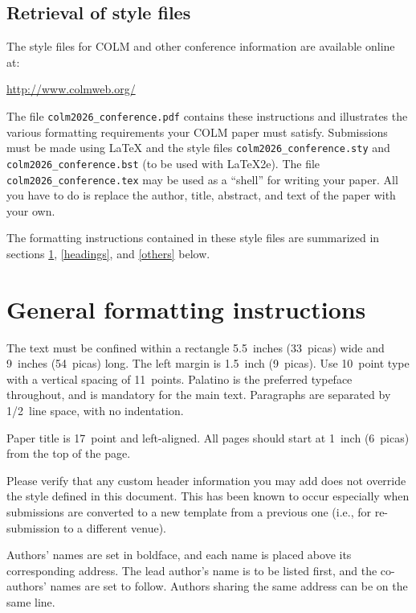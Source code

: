 \documentclass{article} %
\begin{document}
  

\subsection{Retrieval of style files}

The style files for COLM and other conference information are available online at:
\begin{center}
   \url{http://www.colmweb.org/}
\end{center}
The file \verb+colm2026_conference.pdf+ contains these
instructions and illustrates the
various formatting requirements your COLM paper must satisfy.
Submissions must be made using \LaTeX{} and the style files
\verb+colm2026_conference.sty+ and \verb+colm2026_conference.bst+ (to be used with \LaTeX{}2e). The file
\verb+colm2026_conference.tex+ may be used as a ``shell'' for writing your paper. All you
have to do is replace the author, title, abstract, and text of the paper with
your own.

The formatting instructions contained in these style files are summarized in
sections \ref{gen_inst}, \ref{headings}, and \ref{others} below.

\section{General formatting instructions}
\label{gen_inst}

The text must be confined within a rectangle 5.5~inches (33~picas) wide and
9~inches (54~picas) long. The left margin is 1.5~inch (9~picas).
Use 10~point type with a vertical spacing of 11~points. Palatino is the
preferred typeface throughout, and is mandatory for the main text. Paragraphs are separated by 1/2~line space, with no indentation. 

Paper title is 17~point and left-aligned.
All pages should start at 1~inch (6~picas) from the top of the page.

Please verify that any custom header information you may add does not override the style defined in this document. This has been known to occur especially when submissions are converted to a new template from a previous one (i.e., for re-submission to a different venue). 

Authors' names are
set in boldface, and each name is placed above its corresponding
address. The lead author's name is to be listed first, and
the co-authors' names are set to follow. Authors sharing the
same address can be on the same line.
\end{document}
